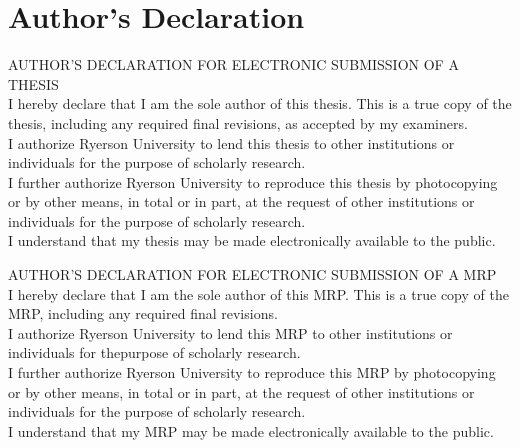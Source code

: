 

\chapter*{Author's Declaration} \label{authors-declaration}

{%
\noindent
AUTHOR'S DECLARATION FOR ELECTRONIC SUBMISSION OF A THESIS \\

\noindent
I hereby declare that I am the sole author of this thesis. This is a true copy of the thesis, including any required final revisions, as accepted by my examiners.\\

\noindent
I authorize Ryerson University to lend this thesis to other institutions or individuals for the purpose of scholarly research. \\

\noindent
I further authorize Ryerson University to reproduce this thesis by photocopying or by other means, in total or in part, at the request of other institutions or individuals for the purpose of scholarly research. \\

\noindent
I understand that my thesis may be made electronically available to the public.

{%
\noindent
AUTHOR'S DECLARATION FOR ELECTRONIC SUBMISSION OF A MRP \\

\noindent
I hereby declare that I am the sole author of this MRP. This is a true copy of the MRP, including any required final revisions.\\

\noindent
I authorize Ryerson University to lend this MRP to other institutions or individuals for thepurpose of scholarly research. \\

\noindent
I further authorize Ryerson University to reproduce this MRP by photocopying or by other means, in total or in part, at the request of other institutions or individuals for the purpose of scholarly research.\\

\noindent
I understand that my MRP may be made electronically available to the public.

}}
